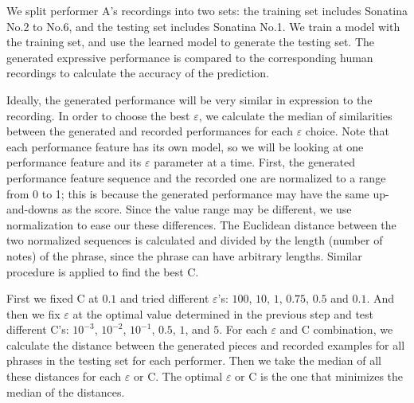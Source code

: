 We split performer A's recordings into two sets: the training set includes Sonatina No.2 to No.6, and the testing set includes Sonatina No.1. We train a model with the training set, and use the learned model to generate the testing set. The generated expressive performance is compared to the corresponding human recordings to calculate the accuracy of the prediction.



Ideally, the generated performance will be very similar in expression to the recording. In order to choose the best $\varepsilon$, we calculate the median of similarities between the generated and recorded performances for each $\varepsilon$ choice. Note that each performance feature has its own model, so we will be looking at one performance feature and its $\varepsilon$  parameter at a time. 
First, the generated performance feature sequence and the recorded one are normalized to a range from 0 to 1; this is because the generated performance may have the same up-and-downs as the score. Since the value range may be different, we use normalization to ease our these differences. The Euclidean distance between the two normalized sequences is calculated and divided by the length (number of notes) of the phrase, since the phrase can have arbitrary lengths. Similar procedure is applied to find the best C.


First we fixed C at $0.1$ and tried different $\varepsilon$'s: $100$, $10$, $1$, $0.75$, $0.5$ and $0.1$. And then we fix $\varepsilon$ at the optimal value determined in the previous step and test different C's: $10^{-3}$, $10^{-2}$, $10^{-1}$, $0.5$, $1$, and $5$. For each $\varepsilon$ and C combination, we calculate the distance between the generated pieces and recorded examples for all phrases in the testing set for each performer. Then we take the median of all these distances for each $\varepsilon$ or C. The optimal $\varepsilon$ or C is the one that minimizes the median of the distances.


